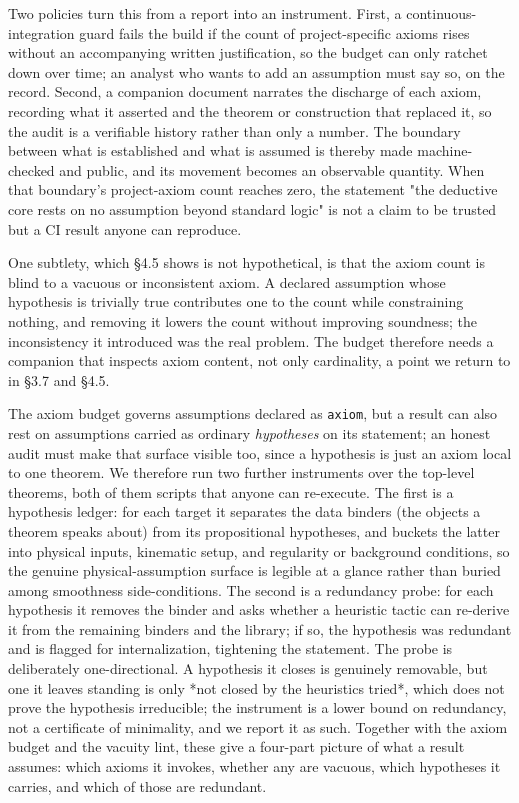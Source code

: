 \documentclass[11pt]{article}
\begin{document}
Two policies turn this from a report into an instrument. First, a continuous-integration guard
fails the build if the count of project-specific axioms rises without an accompanying written
justification, so the budget can only ratchet down over time; an analyst who wants to add an
assumption must say so, on the record. Second, a companion document narrates the discharge of each
axiom, recording what it asserted and the theorem or construction that replaced it, so the audit is
a verifiable history rather than only a number. The boundary between what is established and what is
assumed is thereby made machine-checked and public, and its movement becomes an observable
quantity. When that boundary's project-axiom count reaches zero, the statement "the deductive core
rests on no assumption beyond standard logic" is not a claim to be trusted but a CI result anyone
can reproduce.

One subtlety, which §4.5 shows is not hypothetical, is that the axiom count is blind to a vacuous
or inconsistent axiom. A declared assumption whose hypothesis is trivially true contributes one to
the count while constraining nothing, and removing it lowers the count without improving soundness;
the inconsistency it introduced was the real problem. The budget therefore needs a companion that
inspects axiom content, not only cardinality, a point we return to in §3.7 and §4.5.

The axiom budget governs assumptions declared as \texttt{axiom}, but a result can also rest on
assumptions carried as ordinary \emph{hypotheses} on its statement; an honest audit must make that
surface visible too, since a hypothesis is just an axiom local to one theorem. We therefore run two
further instruments over the top-level theorems, both of them scripts that anyone can re-execute. The
first is a hypothesis ledger: for each target it separates the data binders (the objects a theorem
speaks about) from its propositional hypotheses, and buckets the latter into physical inputs,
kinematic setup, and regularity or background conditions, so the genuine physical-assumption surface
is legible at a glance rather than buried among smoothness side-conditions. The second is a
redundancy probe: for each hypothesis it removes the binder and asks whether a heuristic tactic can
re-derive it from the remaining binders and the library; if so, the hypothesis was redundant and is
flagged for internalization, tightening the statement. The probe is deliberately one-directional. A
hypothesis it closes is genuinely removable, but one it leaves standing is only *not closed by
the heuristics tried*, which does not prove the hypothesis irreducible; the instrument is a lower
bound on redundancy, not a certificate of minimality, and we report it as such. Together with the
axiom budget and the vacuity lint, these give a four-part picture of what a result assumes: which
axioms it invokes, whether any are vacuous, which hypotheses it carries, and which of those are
redundant.
\end{document}
